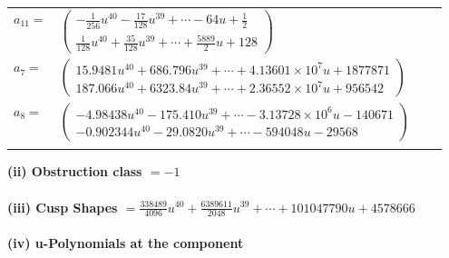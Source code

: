 \documentclass[1p]{elsarticle_modified}
\theoremstyle{definition}
\begin{document}
\begin{tabular}{m{7pt} m{180pt} m{7pt} m{180pt} }
\flushright $a_{11}=$&$\begin{pmatrix}-\frac{1}{256} u^{40}-\frac{17}{128} u^{39}+\cdots-64 u+\frac{1}{2}\\\frac{1}{128} u^{40}+\frac{35}{128} u^{39}+\cdots+\frac{5889}{2} u+128\end{pmatrix}$ \\
\flushright $a_{7}=$&$\begin{pmatrix}15.9481 u^{40}+686.796 u^{39}+\cdots+4.13601\times10^{7} u+1877871\\187.066 u^{40}+6323.84 u^{39}+\cdots+2.36552\times10^{7} u+956542\end{pmatrix}$ \\
\flushright $a_{8}=$&$\begin{pmatrix}-4.98438 u^{40}-175.410 u^{39}+\cdots-3.13728\times10^{6} u-140671\\-0.902344 u^{40}-29.0820 u^{39}+\cdots-594048 u-29568\end{pmatrix}$\\&\end{tabular}
\flushleft \textbf{(ii) Obstruction class $= -1$}\\~\\
\flushleft \textbf{(iii) Cusp Shapes $= \frac{338489}{4096} u^{40}+\frac{6389611}{2048} u^{39}+\cdots+101047790 u+4578666$}\\~\\
\newpage\renewcommand{\arraystretch}{1}
\flushleft \textbf{(iv) u-Polynomials at the component}\newline \\
\end{document}
